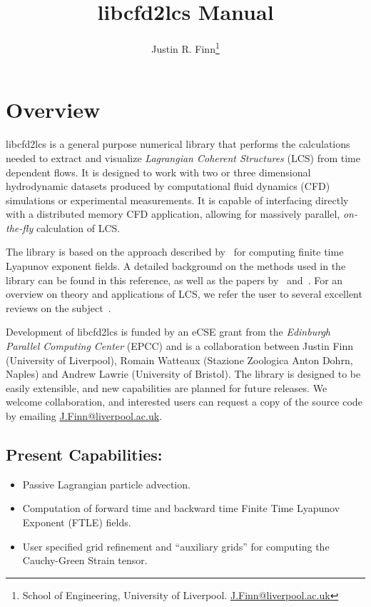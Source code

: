 \documentclass[letterpaper,11pt]{article}
\title{libcfd2lcs Manual}
\author{Justin R. Finn\thanks{School of Engineering, University of Liverpool.  \href{mailto:J.Finn@liverpool.ac.uk}{J.Finn@liverpool.ac.uk}}}
\begin{document}
\maketitle
\section{Overview}
libcfd2lcs is a general purpose numerical library that performs the calculations needed to extract and visualize \emph{Lagrangian Coherent Structures} (LCS) from time dependent flows.  It is designed to work with two or three dimensional hydrodynamic datasets produced by computational fluid dynamics (CFD) simulations or experimental measurements.  It is capable of interfacing directly with a distributed memory CFD application, allowing for massively parallel, \emph{on-the-fly} calculation of LCS.

The library is based on the approach described by~\cite{finn2013integrated} for computing finite time Lyapunov exponent fields.  A detailed background on the methods used in the library can be found in this reference, as well as the papers by~\cite{brunton2010fast} and~\cite{leung2011eulerian}.  For an overview on theory and applications of LCS, we refer the user to several excellent reviews on the subject~\cite{haller2015lagrangian,peacock2015introduction,peacock2010introduction,samelson2013lagrangian}.

Development of libcfd2lcs is funded by an eCSE grant from the \emph{Edinburgh Parallel Computing Center} (EPCC) and is a collaboration between Justin Finn (University of Liverpool), Romain Watteaux (Stazione Zoologica Anton Dohrn, Naples) and Andrew Lawrie (University of Bristol).  The library is designed to be easily extensible, and new capabilities are planned for future releases.  We welcome collaboration, and interested users can request a copy of the source code by emailing \href{mailto:J.Finn@liverpool.ac.uk}{J.Finn@liverpool.ac.uk}.
 
\subsection*{Present Capabilities:}
 \begin{itemize}
 \item Passive Lagrangian particle advection.
 \item Computation of forward time and backward time Finite Time Lyapunov Exponent (FTLE) fields.
 \item User specified grid refinement and ``auxiliary grids'' for computing the Cauchy-Green Strain tensor. 
\end{itemize}
\end{document}
